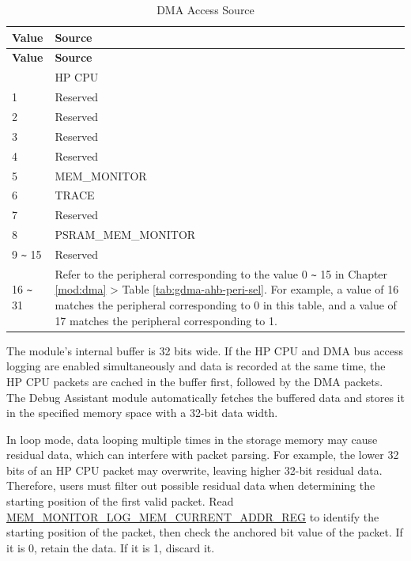 \documentclass[main\_\_EN.tex]{subfiles}
\begin{document}
\begin{longtable}{|l| m{8cm} |}
    \caption{DMA Access Source}\label{tab:assistdbg-dma-source}
    \\\hline
    \rowcolor{lightgray}
    \textbf{Value} & \textbf{Source} \\\hline
    \endfirsthead \hline \rowcolor{lightgray}
    \textbf{Value} & \textbf{Source} \\\hline
    \endhead \endfoot \hline \endlastfoot
    0 & HP CPU \\\hline
    1 & Reserved \\\hline
    2 & Reserved \\\hline
    3 & Reserved \\\hline
    4 & Reserved \\\hline
    5 & MEM\_MONITOR \\\hline
    6 & TRACE \\\hline 
    7 & Reserved \\\hline
    8 & PSRAM\_MEM\_MONITOR \\\hline
    9 \verb+~+ 15 & Reserved \\\hline
    16 \verb+~+ 31 & Refer to the peripheral corresponding to the value 0 \verb+~+ 15 in Chapter \ref{mod:dma} \textit{\nameref{mod:dma}} > Table \ref{tab:gdma-ahb-peri-sel}. For example, a value of 16 matches the peripheral corresponding to 0 in this table, and a value of 17 matches the peripheral corresponding to 1. \\\hline
\end{longtable}

The module's internal buffer is 32 bits wide. If the HP CPU and DMA bus access logging are enabled simultaneously and data is recorded at the same time, the HP CPU packets are cached in the buffer first, followed by the DMA packets. The Debug Assistant module automatically fetches the buffered data and stores it in the specified memory space with a 32-bit data width.

In loop mode, data looping multiple times in the storage memory may cause residual data, which can interfere with packet parsing. For example, the lower 32 bits of an HP CPU packet may overwrite, leaving higher 32-bit residual data. Therefore, users must filter out possible residual data when determining the starting position of the first valid packet. Read \hyperref[regdesc:MEMMONITORLOGMEMCURRENTADDRREG]{MEM\_MONITOR\_LOG\_MEM\_CURRENT\_ADDR\_REG} to identify the starting position of the packet, then check the anchored bit value of the packet. If it is 0, retain the data. If it is 1, discard it. 
\end{document}
